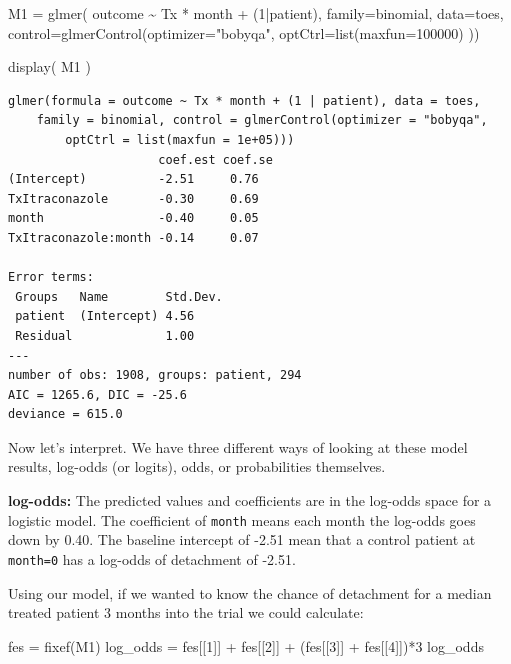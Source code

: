 \documentclass[
  letterpaper,
  DIV=11,
  numbers=noendperiod]{scrreprt}
\newenvironment{Shaded}{}{}
\newcommand{\AttributeTok}[1]{\textcolor[rgb]{0.49,0.56,0.16}{#1}}
\newcommand{\DecValTok}[1]{\textcolor[rgb]{0.25,0.63,0.44}{#1}}
\newcommand{\FunctionTok}[1]{\textcolor[rgb]{0.02,0.16,0.49}{#1}}
\newcommand{\NormalTok}[1]{#1}
\newcommand{\OtherTok}[1]{\textcolor[rgb]{0.00,0.44,0.13}{#1}}
\newcommand{\SpecialCharTok}[1]{\textcolor[rgb]{0.25,0.44,0.63}{#1}}
\newcommand{\StringTok}[1]{\textcolor[rgb]{0.25,0.44,0.63}{#1}}
\begin{document}
\begin{Shaded}
\begin{Highlighting}[]
\NormalTok{M1 }\OtherTok{=} \FunctionTok{glmer}\NormalTok{( outcome }\SpecialCharTok{\textasciitilde{}}\NormalTok{ Tx }\SpecialCharTok{*}\NormalTok{ month }\SpecialCharTok{+}\NormalTok{ (}\DecValTok{1}\SpecialCharTok{|}\NormalTok{patient),}
            \AttributeTok{family=}\NormalTok{binomial,}
            \AttributeTok{data=}\NormalTok{toes, }
            \AttributeTok{control=}\FunctionTok{glmerControl}\NormalTok{(}\AttributeTok{optimizer=}\StringTok{"bobyqa"}\NormalTok{, }
                                 \AttributeTok{optCtrl=}\FunctionTok{list}\NormalTok{(}\AttributeTok{maxfun=}\DecValTok{100000}\NormalTok{) ))}

\FunctionTok{display}\NormalTok{( M1 )}
\end{Highlighting}
\end{Shaded}

\begin{verbatim}
glmer(formula = outcome ~ Tx * month + (1 | patient), data = toes, 
    family = binomial, control = glmerControl(optimizer = "bobyqa", 
        optCtrl = list(maxfun = 1e+05)))
                     coef.est coef.se
(Intercept)          -2.51     0.76  
TxItraconazole       -0.30     0.69  
month                -0.40     0.05  
TxItraconazole:month -0.14     0.07  

Error terms:
 Groups   Name        Std.Dev.
 patient  (Intercept) 4.56    
 Residual             1.00    
---
number of obs: 1908, groups: patient, 294
AIC = 1265.6, DIC = -25.6
deviance = 615.0 
\end{verbatim}

Now let's interpret. We have three different ways of looking at these
model results, log-odds (or logits), odds, or probabilities themselves.

\textbf{log-odds:} The predicted values and coefficients are in the
log-odds space for a logistic model. The coefficient of \texttt{month}
means each month the log-odds goes down by 0.40. The baseline intercept
of -2.51 mean that a control patient at \texttt{month=0} has a log-odds
of detachment of -2.51.

Using our model, if we wanted to know the chance of detachment for a
median treated patient 3 months into the trial we could calculate:

\begin{Shaded}
\begin{Highlighting}[]
\NormalTok{fes }\OtherTok{=} \FunctionTok{fixef}\NormalTok{(M1)}
\NormalTok{log\_odds }\OtherTok{=}\NormalTok{ fes[[}\DecValTok{1}\NormalTok{]] }\SpecialCharTok{+}\NormalTok{ fes[[}\DecValTok{2}\NormalTok{]] }\SpecialCharTok{+}\NormalTok{ (fes[[}\DecValTok{3}\NormalTok{]] }\SpecialCharTok{+}\NormalTok{ fes[[}\DecValTok{4}\NormalTok{]])}\SpecialCharTok{*}\DecValTok{3}
\NormalTok{log\_odds}
\end{Highlighting}
\end{Shaded}
\end{document}
